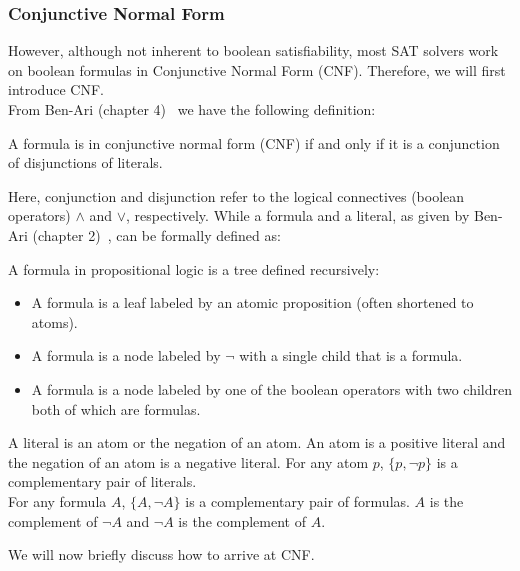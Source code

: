 \subsubsection{Conjunctive Normal Form}\label{sec:CNF}
However, although not inherent to boolean satisfiability, most SAT solvers work on boolean formulas in Conjunctive Normal Form (CNF). Therefore, we will first introduce CNF.
\\
From Ben-Ari (chapter 4)~\cite{Math-Logic-for-CompSci} we have the following definition:
\begin{definition}\label{def:CNF}
    A formula is in conjunctive normal form (CNF) if and only if it is a conjunction of disjunctions of literals.
\end{definition}
Here, conjunction and disjunction refer to the logical connectives (boolean operators) $\wedge$ and $\vee$, respectively. While a formula and a literal, as given by Ben-Ari (chapter 2)~\cite{Math-Logic-for-CompSci}, can be formally defined as:
\begin{definition}\label{def:propositional_formulas}
    A formula in propositional logic is a tree defined recursively:
    \begin{itemize}
        \item A formula is a leaf labeled by an atomic proposition (often shortened
        to atoms).
        \item A formula is a node labeled by $\neg$ with a single child that is a formula.
        \item A formula is a node labeled by one of the boolean operators with two children both of which are formulas.
    \end{itemize}
\end{definition}
\begin{definition}\label{def:propositional_atoms}
    A literal is an atom or the negation of an atom. An atom is a positive
    literal and the negation of an atom is a negative literal. For any atom $p$, $\{p,\neg p\}$ is a complementary pair of literals.
    \\
    For any formula $A$, $\{A,\neg A\}$ is a complementary pair of formulas. $A$ is the complement of $\neg A$ and $\neg A$ is the complement of $A$.
\end{definition}
We will now briefly discuss how to arrive at CNF.

